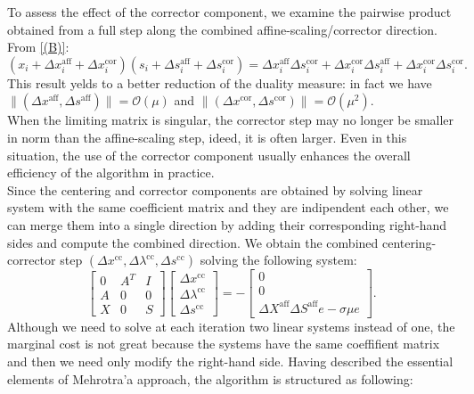 \documentclass[a4paper,10 pt,titlepage,twoside]{book}
\theoremstyle{plain}
\theoremstyle{definition}
\theoremstyle{remark}
\begin{document}
To assess the effect of the corrector component, we examine the pairwise product obtained from a full step along the combined affine-scaling/corrector direction. From \ref{(B)}:
\begin{equation*}
(x_{i}+\Delta x_{i}^{\text{aff}}+\Delta x_{i}^{\text{cor}})(s_{i}+\Delta s_{i}^{\text{aff}}+\Delta s_{i}^{\text{cor}})= \Delta x_{i}^{\text{aff}}\Delta s_{i}^{\text{cor}}+\Delta x_{i}^{\text{cor}}\Delta s_{i}^{\text{aff}}+\Delta x_{i}^{\text{cor}}\Delta s_{i}^{\text{cor}}.
\end{equation*}
This result yelds to a better reduction of the duality measure: in fact we have \\$\lVert(\Delta x^{\text{aff}},\Delta s^{\text{aff}}) \rVert = \mathcal{O}(\mu)$ and $\lVert(\Delta x^{\text{cor}},\Delta s^{\text{cor}}) \rVert = \mathcal{O}(\mu^{2})$.
\\
When the limiting matrix is singular, the corrector step may no longer be smaller in norm than the affine-scaling step, ideed, it is often larger. Even in this situation, the use of the corrector component usually enhances the overall efficiency of the algorithm in practice.\\
Since the centering and corrector components are obtained by solving linear system with the same coefficient matrix and they are indipendent each other, we can merge them into a single direction by adding their corresponding right-hand sides and compute the combined direction. 
We obtain the combined centering-corrector step $(\Delta x^{\text{cc}}, \Delta \lambda^{\text{cc}}, \Delta s^{\text{cc}})$ solving the following system:
\begin{equation}\label{(C)}
\begin{bmatrix}
0&A^{T}&I \\A&0&0\\X&0&S
\end{bmatrix}\begin{bmatrix}
\Delta x^{\text{cc}}\\\Delta\lambda^{\text{cc}} \\\Delta s^{\text{cc}}
\end{bmatrix}=-\begin{bmatrix}
0\\0\\\Delta X^{\text{aff}}\Delta S^{\text{aff}}e - \sigma\mu e
\end{bmatrix}.
\end{equation}
Although we need to solve at each iteration two linear systems instead of one, the marginal cost is not great because the systems have the same coeffifient matrix and then we need only modify the right-hand side. Having described the essential elements of Mehrotra'a approach, the algorithm is structured as following:
\end{document}
